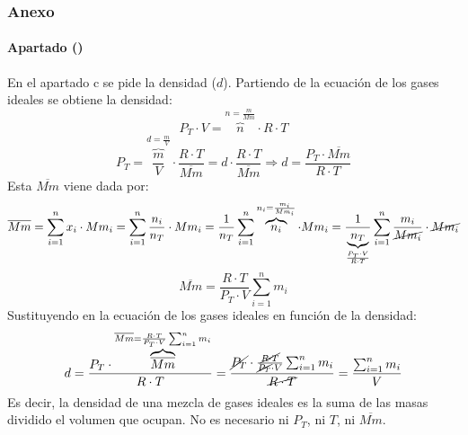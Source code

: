\begin{frame}
    \frametitle{Anexo}
    \framesubtitle{Apartado ()}
    En el apartado c se pide la densidad ($d$). Partiendo de la ecuación de los gases ideales se obtiene la densidad:
    $$
        P_T\cdot V = \overbrace{n}^{n=\frac{m}{Mm}}\cdot R\cdot T
    $$
    $$
        P_T=\overbrace{\frac{m}{V}}^{d=\frac{m}{V}}\cdot\frac{R\cdot T}{\overline{Mm}} = d\cdot\frac{R\cdot T}{\overline{Mm}}
        \Rightarrow
        d=\frac{P_T\cdot\overline{Mm}}{R\cdot T}
    $$
    Esta $\overline{Mm}$ viene dada por:
    $$
        \overline{Mm}=\sum_{i=1}^{n}x_i\cdot Mm_i = \sum_{i=1}^{n}\frac{n_i}{n_T}\cdot Mm_i =\frac{1}{n_T}\sum_{i=1}^{n}\overbrace{n_i}^{n_i=\frac{m_i}{Mm_i}}\cdot Mm_i= \frac{1}{\underbrace{n_T}_{\frac{P_T\cdot V}{R\cdot T}}}\sum_{i=1}^{n}\frac{m_i}{\cancel{Mm_i}}\cdot\cancel{Mm_i}
    $$
    $$
        \overline{Mm}=\frac{R\cdot T}{P_T\cdot V}\sum_{i=1}^{n}m_i
    $$
    Sustituyendo en la ecuación de los gases ideales en función de la densidad:
    $$
        d=\frac{P_T\cdot\overbrace{\overline{Mm}}^{\overline{Mm}=\frac{R\cdot T}{P_T\cdot V}\sum_{i=1}^{n}m_i}}{R\cdot T}=
        \frac{\cancel{P_T}\cdot\frac{\cancel{R\cdot T}}{\cancel{P_T}\cdot V}\sum_{i=1}^{n}m_i}{\cancel{R\cdot T}}=
        \frac{\sum_{i=1}^{n}m_i}{V}
    $$
    Es decir, la densidad de una mezcla de gases ideales es la suma de las masas dividido el volumen que ocupan. No es necesario ni $P_T$, ni $T$, ni $\overline{Mm}$.
\end{frame}

